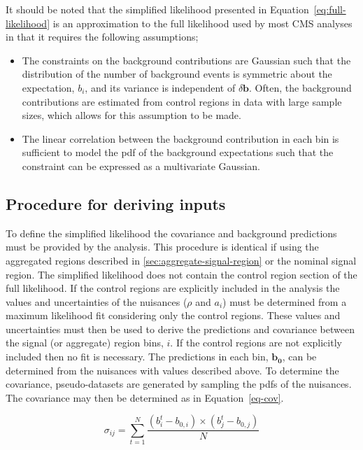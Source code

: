 It should be noted that the simplified likelihood presented in Equation~\ref{eq:full-likelihood} is an approximation to the full likelihood used 
by most CMS analyses in that it requires the following assumptions;

\begin{itemize}
\item{The constraints on the background contributions are Gaussian such that the distribution of the number of background events is symmetric about the expectation, $b_{i}$, 
and its variance is independent of $\delta \mathbf{b}$. Often, the background contributions are estimated from control regions in data with large sample sizes, which allows for this 
assumption to be made.}

\item{The linear correlation between the background contribution in each bin is sufficient to model the  pdf of the background expectations such that the constraint 
can be expressed as a multivariate Gaussian.}
\end{itemize}




\subsection{Procedure for deriving inputs}

To define the simplified likelihood the covariance and background predictions must be 
provided by the analysis. This procedure is identical if using the 
aggregated regions described in \ref{sec:aggregate-signal-region} or the nominal signal region. 
The simplified likelihood does not contain the control region 
section of the full likelihood. If the control regions are explicitly included in the analysis
the values and uncertainties of the nuisances ($\rho$ and $a_i$)
must be determined from a maximum likelihood fit considering only the control regions.
These values and uncertainties must then be used to derive the predictions and covariance
between the signal (or aggregate) region bins, $i$. If the control regions are not explicitly 
included then no fit is necessary. The predictions in each bin, $\mathbf{b_0}$, can be 
determined from the nuisances with values described above. To determine the covariance, pseudo-datasets are generated
by sampling the pdfs of the nuisances. The covariance may then be determined as in Equation~\ref{eq-cov}.

\begin{equation}
\sigma_{ij}=\sum^N_{t=1}{\frac{(b^t_i-b_{0,i})\times(b^t_j-b_{0,j})}{N}}
\label{eq-cov}
\end{equation}

